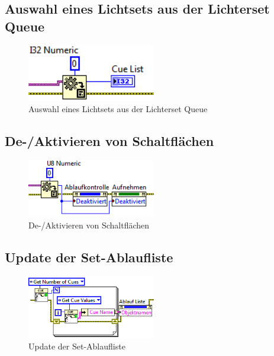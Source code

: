 	\subsection{Auswahl eines Lichtsets aus der Lichterset Queue}
	\begin{figure}[h!]
	\centering
		\includegraphics[width=0.5\textwidth]{Pics/front-auswahl.png}
	\caption{Auswahl eines Lichtsets aus der Lichterset Queue}
	\label{fig:a4}
	\end{figure}
	
	\subsection{De-/Aktivieren von Schaltflächen}	
	\begin{figure}[h!]
	\centering
		\includegraphics[width=0.5\textwidth]{Pics/front-deaktivieren.png}
	\caption{De-/Aktivieren von Schaltflächen}
	\label{fig:a5}
	\end{figure}

	\subsection{Update der Set-Ablaufliste}
	\begin{figure}[h!]
	\centering
		\includegraphics[width=0.5\textwidth]{Pics/front-updateCue.png}
	\caption{Update der Set-Ablaufliste}
	\label{fig:a6}
	\end{figure}
	\newpage	
	

